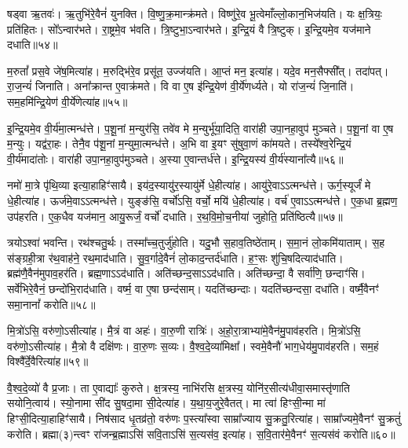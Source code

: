 षड्वा ऋ॒तवः॑।
ऋ॒तुभि॑रे॒वैनं॑ युनक्ति।
वि॒ष्णु॒क्र॒मान्क्र॑मते।
विष्णु॑रे॒व भू॒त्वेमाँल्लो॒कान॒भिज॑यति।
यः क्ष॒त्रियः॒ प्रति॑\-हितः।
सो᳚ऽन्वार॑भते।
रा॒ष्ट्रमे॒व भ॑वति।
त्रि॒ष्टुभा॒\-ऽन्वार॑भते।
इ॒न्द्रि॒यं वै त्रि॒ष्टुक्।
इ॒न्द्रि॒यमे॒व यज॑माने दधाति॥५४॥

म॒रुतां᳚ प्रस॒वे जे॑ष॒मित्या॑ह।
म॒रुद्भि॑रे॒व प्रसू॑त॒ उज्ज॑यति।
आ॒प्तं मन॒ इत्या॑ह।
यदे॒व मन॒सैफ्सी᳚त्।
तदा॑पत्।
रा॒ज॒न्यं॑ जिनाति।
अना᳚क्रान्त ए॒वाक्र॑मते।
वि वा ए॒ष इ॑न्द्रि॒येण॑ वी॒र्ये॑णर्ध्यते।
यो रा॑ज॒न्यं॑ जि॒नाति॑।
सम॒हमि॑न्द्रि॒येण॑ वी॒र्ये॑णेत्या॑ह॥५५॥

इ॒न्द्रि॒यमे॒व वी॒र्य॑मा॒त्मन्ध॑त्ते।
प॒शू॒नां म॒न्युर॑सि॒ तवे॑व मे म॒न्युर्भू॑या॒दिति॒ वारा॑ही उपा॒नहा॒वुप॑ मुञ्चते।
प॒शू॒नां वा ए॒ष म॒न्युः।
यद्व॑रा॒हः।
तेनै॒व प॑शू॒नां म॒न्युमा॒त्मन्ध॑त्ते।
अ॒भि वा इ॒यꣳ सु॑षुवा॒णं का॑मयते।
तस्ये᳚श्व॒रेन्द्रि॒यं वी॒र्य॑मादा॑तोः।
वारा॑ही उपा॒नहा॒वुप॑मुञ्चते।
अ॒स्या ए॒वान्तर्ध॑त्ते।
इ॒न्द्रि॒यस्य॑ वी॒र्य॑स्याना᳚त्यै॥५६॥

नमो॑ मा॒त्रे पृ॑थि॒व्या इत्या॒हाहिꣳ॑सायै।
इय॑द॒स्यायु॑र॒स्यायु॑र्मे धे॒हीत्या॑ह।
आयु॑रे॒वाऽऽत्मन्ध॑त्ते।
ऊर्ग॒स्यूर्जं॑ मे धे॒हीत्या॑ह।
ऊर्ज॑मे॒वाऽऽत्मन्ध॑त्ते।
युङ्ङ॑सि॒ वर्चो॑ऽसि॒ वर्चो॒ मयि॑ धे॒हीत्या॑ह।
वर्च॑ ए॒वाऽऽत्मन्ध॑त्ते।
ए॒क॒धा ब्र॒ह्मण॒ उप॑हरति।
ए॒क॒धैव यज॑मान॒ आयु॒रूर्जं॒ वर्चो॑ दधाति।
र॒थ॒वि॒मो॒च॒नीया॑ जुहोति॒ प्रति॑\-ष्ठित्यै॥५७॥

त्रयो\-ऽश्वा॑ भवन्ति।
रथ॑श्चतु॒र्थः।
तस्मा᳚च्च॒तुर्जु॑होति।
यदु॒भौ स॒हाव॒तिष्ठे॑ताम्।
स॒मा॒नं लो॒कमि॑याताम्।
स॒ह स॑ङ्ग्रही॒त्रा र॑थ॒वाह॑ने॒ रथ॒माद॑धाति।
सु॒व॒र्गादे॒वैनं॑ लो॒काद॒न्तर्द॑धाति।
ह॒ꣳ॒सः शु॑चि॒षदित्याद॑धाति।
ब्रह्म॑णै॒वैन॑मुपाव॒हर॑ति।
ब्रह्म॒णा\-ऽऽद॑धाति।
अति॑च्छन्द॒सा\-ऽऽद॑धाति।
अति॑च्छन्दा॒ वै सर्वा॑णि॒ छन्दाꣳ॑सि।
सर्वे॑भिरे॒वैनं॒ छन्दो॑भि॒राद॑धाति।
वर्ष्म॒ वा ए॒षा छन्द॑साम्।
यदति॑च्छन्दाः।
यदति॑च्छन्दसा॒ दधा॑ति।
वर्ष्मै॒वैनꣳ॑ समा॒नानां᳚ करोति॥५८॥\anuvakamend[प॒द्य॒न्ते॒ द॒धा॒ति॒ वी॒र्ये॑णेत्या॒हाना᳚त्यै॒ प्रति॑\-ष्ठित्यै॒ ब्रह्म॒णा\-ऽऽद॑धाति स॒प्त च॑]

मि॒त्रो॑ऽसि॒ वरु॑णो॒\-ऽसीत्या॑ह।
मै॒त्रं वा अहः॑।
वा॒रु॒णी रात्रिः॑।
अ॒हो॒रा॒त्राभ्या॑मे॒वैन॑मु॒पाव॑हरति।
मि॒त्रो॑ऽसि॒ वरु॑णो॒\-ऽसीत्या॑ह।
मै॒त्रो वै दक्षि॑णः।
वा॒रु॒णः स॒व्यः।
वै॒श्व॒दे॒व्या॑मिक्षा᳚।
स्वमे॒वैनौ॑ भाग॒धेय॑मु॒पाव॑हरति।
सम॒हं विश्वै᳚र्दे॒वैरित्या॑ह॥५९॥

वै॒श्व॒दे॒व्यो॑ वै प्र॒जाः।
ता ए॒वाद्याः᳚ कुरुते।
क्ष॒त्रस्य॒ नाभि॑रसि क्ष॒त्रस्य॒ योनि॑र॒सीत्य॑धीवा॒समास्तृ॑णाति सयोनि॒त्वाय॑।
स्यो॒नामा सी॑द सु॒षदा॒मा सी॒देत्या॑ह।
य॒था॒\-य॒जु\-रे॒वै\-तत्।
मा त्वा॑ हिꣳसी॒न्मा मा॑ हिꣳसी॒दित्या॒हाहिꣳ॑सायै।
निष॑साद धृ॒तव्र॑तो॒ वरु॑णः प॒स्त्या᳚स्वा साम्रा᳚ज्याय सु॒क्रतु॒रित्या॑ह।
साम्रा᳚ज्यमे॒वैनꣳ॑ सु॒क्रतुं॑ करोति।
ब्रह्मा(३)न्त्वꣳ रा॑जन्ब्र॒ह्माऽसि॑ सवि॒ताऽसि॑ स॒त्यस॑व॒ इत्या॑ह।
स॒वि॒तार॑मे॒वैनꣳ॑ स॒त्यस॑वं करोति॥६०॥

